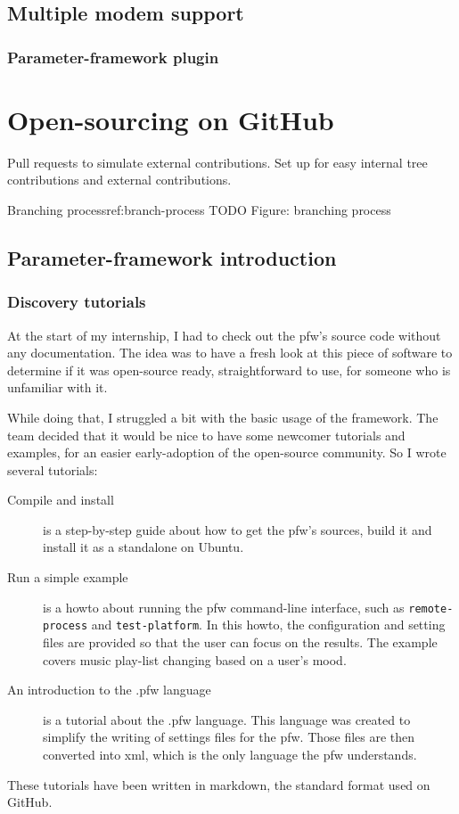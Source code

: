 \subsection{Multiple modem support}
\subsubsection{Parameter-framework plugin}

\section{Open-sourcing on GitHub}
Pull requests to simulate external contributions.
Set up for easy internal tree contributions and external contributions.

\begin{figureGraphics}{Branching process}{ref:branch-process}
    TODO
    Figure: branching process
\end{figureGraphics}


\subsection{Parameter-framework introduction}
\subsubsection{Discovery tutorials}\label{sec:tutorials}

At the start of my internship, I had to check out the \gls{pfw}'s
source code without any documentation. The idea was to have a fresh look at
this piece of software to determine if it was open-source ready, straightforward
to use, for someone who is unfamiliar with it.

While doing that, I struggled a bit with the basic usage of the framework. The
team decided that it would be nice to have some newcomer tutorials and examples,
for an easier early-adoption of the open-source community. So I wrote several
tutorials:
\begin{description}
    \item[Compile and install]
        is a step-by-step guide about how to get the \gls{pfw}'s sources,
        build it and install it as a standalone on Ubuntu.
    \item[Run a simple example]
        is a howto about running the \gls{pfw} command-line interface,
        such as \lstinline{remote-process} and \lstinline {test-platform}.  In
        this howto, the configuration and setting files are provided so that
        the user can focus on the results. The example covers music play-list
        changing based on a user's mood.
    \item[An introduction to the .pfw language]\label{desc:pfw-language}
        is a tutorial about the .pfw language. This language was
        created to simplify the writing of settings files for the
        \gls{pfw}. Those files are then converted into \gls{xml}, which is
        the only language the \gls{pfw} understands.
\end{description}
These tutorials have been written in \gls{markdown}, the standard format used
on GitHub.


